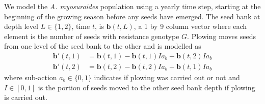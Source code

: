 \documentclass[12pt, a4paper]{article}
\begin{document}
We model the \textit{A. myosuroides} population using a yearly time step, starting at the beginning of the growing season before any seeds have emerged. The seed bank at depth level $L \in \{1, 2\}$, time $t$, is $\mathbf{b}(t, L)$, a 1 by 9 column vector where each element is the number of seeds with resistance genotype $G$. Plowing moves seeds from one level of the seed bank to the other and is modelled as
\begin{subequations}
\label{eq:sb_pp}
\begin{align}
	\mathbf{b}'(t, 1) &= \mathbf{b}(t, 1) - \mathbf{b}(t, 1) I a_b + \mathbf{b}(t, 2) I a_b \\
	\mathbf{b}'(t, 2) &= \mathbf{b}(t, 2) - \mathbf{b}(t, 2) I a_b + \mathbf{b}(t, 1) I a_b
\end{align}
\end{subequations} 
where sub-action $a_b \in \{0, 1\}$ indicates if plowing was carried out or not and $I \in [0, 1]$ is the portion of seeds moved to the other seed bank depth if plowing is carried out. 
\end{document}
